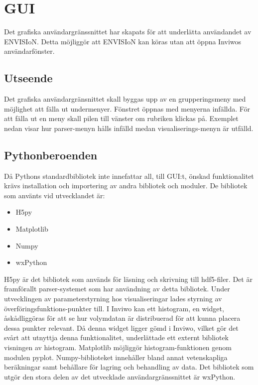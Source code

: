 \section{GUI}
Det grafiska användargränssnittet har skapats för att underlätta användandet av ENVISIoN.  Detta möjliggör att ENVISIoN kan köras utan att öppna Inviwos användarfönster. 
\subsection{Utseende}
Det grafiska användargränsnittet skall byggas upp av en grupperingsmeny med möjlighet att fälla ut undermenyer. Fönstret öppnas med menyerna infällda. För att fälla ut en meny skall pilen till vänster om rubriken klickas på. Exemplet nedan visar hur parser-menyn hålls infälld medan visualiserings-menyn är utfälld.

\subsection{Pythonberoenden}
Då Pythons standardbibliotek inte innefattar all, till GUI:t, önskad funktionalitet krävs installation och importering av andra bibliotek och moduler. De bibliotek som använts vid utvecklandet är:

\begin{itemize}
    \setlength\itemsep{0em}
    \item H5py
    \item Matplotlib
    \item Numpy
    \item wxPython
\end{itemize}

H5py är det bibliotek som används för läsning och skrivning till hdf5-filer. Det är framförallt parser-systemet som har användning av detta bibliotek. Under utvecklingen av parameterstyrning hos visualiseringar lades styrning av överföringsfunktions-punkter till. I Inviwo kan ett histogram, en widget, åskådliggöras för att se hur volymdatan är distribuerad för att kunna placera dessa punkter relevant. Då denna widget ligger gömd i Inviwo, vilket gör det svårt att utnyttja denna funktionalitet, underlättade ett externt bibliotek visningen av histogram. Matplotlib möjliggör histogram-funktionen genom modulen pyplot. Numpy-biblioteket innehåller bland annat vetenskapliga beräkningar samt behållare för lagring och behandling av data.
Det bibliotek som utgör den stora delen av det utvecklade användargränssnittet är wxPython. 
